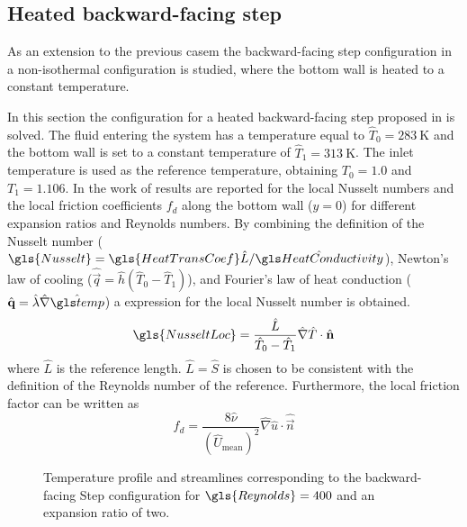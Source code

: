 
\subsection{Heated backward-facing step}\label{ssec:HeatedBackwardFacingStep}


As an extension to the previous casem the backward-facing step configuration in a non-isothermal configuration is studied, where the bottom wall is heated to a constant temperature. 


In this section the configuration for a heated backward-facing step proposed in \cite{xieFluidFlowHeat2016} is solved. 
The fluid entering the system has a temperature equal to $\hat T_0 = \SI{283}{\kelvin}$ and the bottom wall is set to a constant temperature of $\hat T_1 =\SI{313}{\kelvin}$. The inlet temperature is used as the reference temperature, obtaining $T_0 = 1.0$ and $T_1 = 1.106$.
In the work of \cite{xieFluidFlowHeat2016} results are reported for the local Nusselt numbers and the local friction coefficients $f_d$  along the bottom wall ($y = 0$) for different expansion ratios and Reynolds numbers.
By combining the definition of the Nusselt number ($\gls{Nusselt} = \gls{HeatTransCoef}\hat{L}/\glsHat{HeatConductivity}$), Newton's law of cooling ($\hat{\vec{q}} = \hat{h} (\hat{T}_0 - \hat{T}_1 )$), and Fourier's law of heat conduction ($\hat{\vec{q}} = \hat \lambda \hat{\nabla} \glsHat{temp}$) a expression for the local Nusselt number is obtained.
\begin{equation}
	\gls{NusseltLoc} = \frac{\hat L}{\hat T_0-\hat T_1}\hat \nabla \hat T \cdot \hat {\vec{n}}
\end{equation}
where $\hat L$ is the reference length. $ \hat L = \hat S$ is chosen to be consistent with the definition of the Reynolds number of the reference. Furthermore, the local friction factor can be written as %
\begin{equation}
	f_d = \frac{8\hat \nu} { (\hat U_{\text{mean}})^2}  \hat \nabla \hat u \cdot \hat {\vec{n}}
\end{equation}

\begin{figure}[t]
	\centering
	\pgfplotsset{width=0.81\textwidth, compat=1.3}
	\caption{Temperature profile and streamlines corresponding to the backward-facing Step configuration for $\gls{Reynolds} = 400$ and an expansion ratio of two.} \label{fig:BFS_Temperature_Streamlines}
\end{figure}

